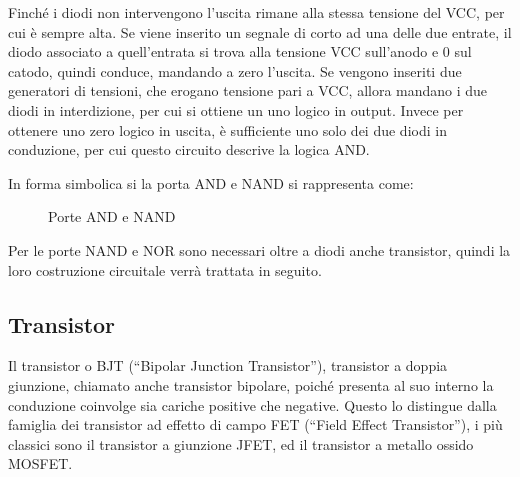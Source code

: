 \documentclass{article}
\numberwithin{equation}{subsection}
\begin{document}
Finché i diodi non intervengono l'uscita rimane alla stessa tensione del VCC, per cui è sempre alta. 
Se viene inserito un segnale di corto ad una delle due entrate, il diodo associato a quell'entrata si trova alla tensione VCC sull'anodo e $0$ sul 
catodo, quindi conduce, mandando a zero l'uscita. Se vengono inseriti due generatori di tensioni, che erogano tensione pari a VCC, allora mandano i 
due diodi in interdizione, per cui si ottiene un uno logico in output. Invece per ottenere uno zero logico in uscita, è sufficiente uno solo dei due diodi in conduzione, per cui 
questo circuito descrive la logica AND. 


In forma simbolica si la porta AND e NAND si rappresenta come: 
\begin{figure}[H]%
    \centering
    \qquad 
    \caption{Porte AND e NAND}
    \label{fig:porte-and-nand}
\end{figure}


Per le porte NAND e NOR sono necessari oltre a diodi anche transistor, quindi la loro costruzione circuitale verrà trattata in seguito. 

\subsection{Transistor}

Il transistor o BJT (``Bipolar Junction Transistor''), transistor a doppia giunzione, chiamato anche transistor bipolare, poiché presenta al suo interno la conduzione 
coinvolge sia cariche positive che negative. Questo lo distingue dalla famiglia dei transistor ad effetto di campo FET (``Field Effect Transistor''), i più classici sono 
il transistor a giunzione JFET, ed il transistor a metallo ossido MOSFET. 
\end{document}
